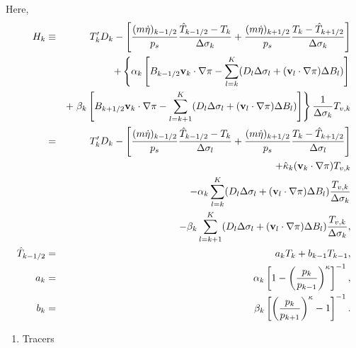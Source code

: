 Here, \begin{eqnarray}
   H_k
     &\equiv &  T_k' D_k
              - \left[   \frac{(m\dot{\eta})_{k-1/2}}{p_s} \frac{\hat{T}_{k-1/2} - T_k}{\Delta\sigma_k}
               + \frac{(m\dot{\eta})_{k+1/2}}{p_s} \frac{T_k - \hat{T}_{k+1/2}}{\Delta\sigma_k} \right] \notag\\
        &&+ \left\{ \alpha_k
                    \left[ B_{k-1/2} {\mathbf{v}}_k \cdot \nabla \pi
                          - \sum_{l=k}^{K}
                           (D_l \Delta \sigma_l + ({\mathbf{v}}_l \cdot \nabla \pi)\Delta B_l)
                    \right]
             \right. \notag\\
          &&+ \left. \beta_k
                     \left[ B_{k+1/2} {\mathbf{v}}_k \cdot \nabla \pi
                          - \sum_{l=k+1}^{K}
                           (D_l \Delta \sigma_l + ({\mathbf{v}}_l \cdot \nabla \pi)\Delta B_l)
                    \right]
              \right\}
              \frac{1}{\Delta \sigma_k} T_{v,k}\notag\\
     &= & T_k' D_k
          - \left[ \frac{(m\dot{\eta})_{k-1/2}}{p_s} \frac{\hat{T}_{k-1/2} - T_k}{\Delta \sigma_l}
               + \frac{(m\dot{\eta})_{k+1/2}}{p_s} \frac{T_k - \hat{T}_{k+1/2}}{\Delta \sigma_l} \right] \notag\\
        &&+ \hat{\kappa}_k ({\mathbf{v}}_k \cdot \nabla \pi) T_{v,k} \notag\\
        &&- \alpha_k \sum_{l=k}^{K}
                           (D_l \Delta \sigma_l + ({\mathbf{v}}_l \cdot \nabla \pi)\Delta B_l)
                            \frac{T_{v,k}}{\Delta \sigma_k} \notag\\
        &&- \beta_k \sum_{l=k+1}^{K}
                           (D_l \Delta \sigma_l + ({\mathbf{v}}_l \cdot \nabla \pi)\Delta B_l)
                            \frac{T_{v,k}}{\Delta \sigma_k}, \\
  \hat{T}_{k-1/2}
   &=& a_k T_k + b_{k-1} T_{k-1}, \\
  a_k  &=&  \alpha_k
              \left[ 1- \left( \frac{ p_k }{ p_{k-1} }
                        \right)^{\kappa} \right]^{-1},  \\
  b_k  &=&  \beta_k
              \left[ \left( \frac{ p_k }{ p_{k+1} }
                     \right)^{\kappa} - 1 \right]^{-1} .  \end{eqnarray}

\begin{enumerate}
\def\labelenumi{\arabic{enumi}.}
\tightlist
\item
  Tracers
\end{enumerate}

